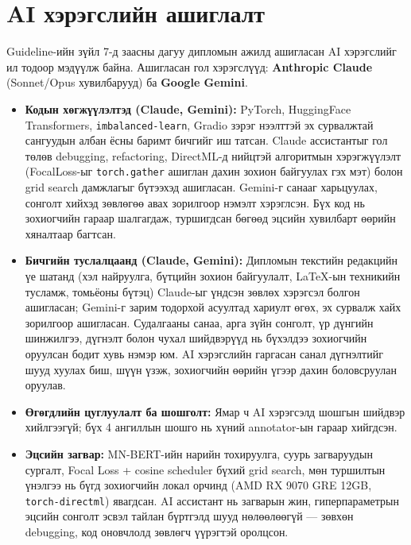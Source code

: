 \section{AI хэрэгслийн ашиглалт}
\label{sec:ai-disclosure}

Guideline-ийн зүйл 7-д заасны дагуу дипломын ажилд ашигласан AI хэрэгслийг
ил тодоор мэдүүлж байна. Ашигласан гол хэрэгслүүд: \textbf{Anthropic Claude}
(Sonnet/Opus хувилбарууд) ба \textbf{Google Gemini}.

\begin{itemize}
  \item \textbf{Кодын хөгжүүлэлтэд (Claude, Gemini):} PyTorch, HuggingFace
    Transformers, \texttt{imbalanced-learn}, Gradio зэрэг нээлттэй эх
    сурвалжтай сангуудын албан ёсны баримт бичгийг иш татсан. Claude
    ассистантыг гол төлөв debugging, refactoring, DirectML-д нийцтэй
    алгоритмын хэрэгжүүлэлт (FocalLoss-ыг \texttt{torch.gather} ашиглан
    дахин зохион байгуулах гэх мэт) болон grid search дамжлагыг
    бүтээхэд ашигласан. Gemini-г санааг харьцуулах, сонголт хийхэд
    зөвлөгөө авах зорилгоор нэмэлт хэрэглсэн. Бүх код нь зохиогчийн
    гараар шалгагдаж, туршигдсан бөгөөд эцсийн хувилбарт өөрийн
    хяналтаар багтсан.
  \item \textbf{Бичгийн туслалцаанд (Claude, Gemini):} Дипломын текстийн
    редакцийн үе шатанд (хэл найруулга, бүтцийн зохион байгуулалт,
    LaTeX-ын техникийн тусламж, томьёоны бүтэц) Claude-ыг үндсэн
    зөвлөх хэрэгсэл болгон ашигласан; Gemini-г зарим тодорхой асуултад
    хариулт өгөх, эх сурвалж хайх зорилгоор ашигласан. Судалгааны
    санаа, арга зүйн сонголт, үр дүнгийн шинжилгээ, дүгнэлт болон
    чухал шийдвэрүүд нь бүхэлдээ зохиогчийн оруулсан бодит хувь нэмэр
    юм. AI хэрэгслийн гаргасан санал дүгнэлтийг шууд хуулах биш, шүүн
    үзэж, зохиогчийн өөрийн үгээр дахин боловсруулан оруулав.
  \item \textbf{Өгөгдлийн цуглуулалт ба шошголт:} Ямар ч AI хэрэгсэлд
    шошгын шийдвэр хийлгээгүй; бүх 4 ангиллын шошго нь хүний
    annotator-ын гараар хийгдсэн.
  \item \textbf{Эцсийн загвар:} MN-BERT-ийн нарийн тохируулга, суурь загваруудын
    сургалт, Focal Loss + cosine scheduler бүхий grid search, мөн
    туршилтын үнэлгээ нь бүгд зохиогчийн локал орчинд (AMD RX 9070 GRE
    12GB, \texttt{torch-directml}) явагдсан. AI ассистант нь загварын
    жин, гиперпараметрын эцсийн сонголт эсвэл тайлан бүртгэлд шууд
    нөлөөлөөгүй --- зөвхөн debugging, код оновчлолд зөвлөгч үүрэгтэй
    оролцсон.
\end{itemize}

